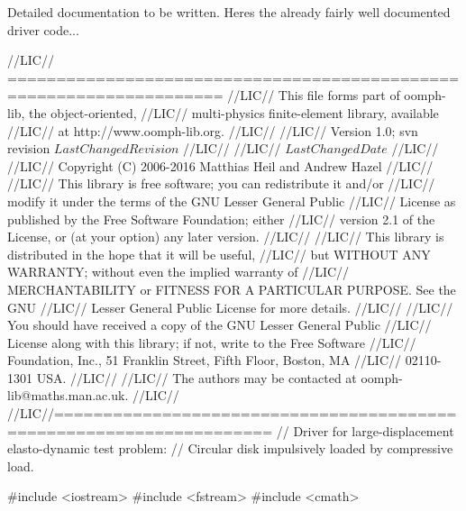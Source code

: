 Detailed documentation to be written. Here\textquotesingle{}s the already fairly well documented driver code...


\begin{DoxyCodeInclude}
\textcolor{comment}{//LIC// ====================================================================}
\textcolor{comment}{//LIC// This file forms part of oomph-lib, the object-oriented, }
\textcolor{comment}{//LIC// multi-physics finite-element library, available }
\textcolor{comment}{//LIC// at http://www.oomph-lib.org.}
\textcolor{comment}{//LIC// }
\textcolor{comment}{//LIC//    Version 1.0; svn revision $LastChangedRevision$}
\textcolor{comment}{//LIC//}
\textcolor{comment}{//LIC// $LastChangedDate$}
\textcolor{comment}{//LIC// }
\textcolor{comment}{//LIC// Copyright (C) 2006-2016 Matthias Heil and Andrew Hazel}
\textcolor{comment}{//LIC// }
\textcolor{comment}{//LIC// This library is free software; you can redistribute it and/or}
\textcolor{comment}{//LIC// modify it under the terms of the GNU Lesser General Public}
\textcolor{comment}{//LIC// License as published by the Free Software Foundation; either}
\textcolor{comment}{//LIC// version 2.1 of the License, or (at your option) any later version.}
\textcolor{comment}{//LIC// }
\textcolor{comment}{//LIC// This library is distributed in the hope that it will be useful,}
\textcolor{comment}{//LIC// but WITHOUT ANY WARRANTY; without even the implied warranty of}
\textcolor{comment}{//LIC// MERCHANTABILITY or FITNESS FOR A PARTICULAR PURPOSE.  See the GNU}
\textcolor{comment}{//LIC// Lesser General Public License for more details.}
\textcolor{comment}{//LIC// }
\textcolor{comment}{//LIC// You should have received a copy of the GNU Lesser General Public}
\textcolor{comment}{//LIC// License along with this library; if not, write to the Free Software}
\textcolor{comment}{//LIC// Foundation, Inc., 51 Franklin Street, Fifth Floor, Boston, MA}
\textcolor{comment}{//LIC// 02110-1301  USA.}
\textcolor{comment}{//LIC// }
\textcolor{comment}{//LIC// The authors may be contacted at oomph-lib@maths.man.ac.uk.}
\textcolor{comment}{//LIC// }
\textcolor{comment}{//LIC//====================================================================}
\textcolor{comment}{// Driver for large-displacement elasto-dynamic test problem:}
\textcolor{comment}{// Circular disk impulsively loaded by compressive load.}

\textcolor{preprocessor}{#include <iostream>}
\textcolor{preprocessor}{#include <fstream>}
\textcolor{preprocessor}{#include <cmath>}


\end{DoxyCodeInclude}
